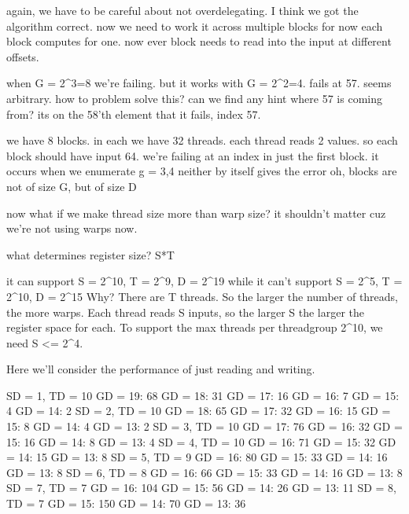 again, we have to be careful about not overdelegating.
I think we got the algorithm correct. now we need to work it across multiple blocks
for now each block computes for one.
now ever block needs to read into the input at different offsets. 

when G = 2^3=8 we're failing. 
but it works with G = 2^2=4.
fails at 57. seems arbitrary.
how to problem solve this?
can we find any hint where 57 is coming from? its on the 58'th element that it fails, index 57.

we have 8 blocks. in each we have 32 threads. each thread reads 2 values.
so each block should have input 64.
we're failing at an index in just the first block.
it occurs when we enumerate g = 3,4
neither by itself gives the error
oh, blocks are not of size G, but of size D

now what if we make thread size more than warp size?
it shouldn't matter cuz we're not using warps now.

what determines register size? S*T

it can support S = 2^10, T = 2^9, D = 2^19
while it can't support S = 2^5, T = 2^10, D = 2^15
Why?
There are T threads. So the larger the number of threads, the more warps.
Each thread reads S inputs, so the larger S the larger the register space for each.
To support the max threads per threadgroup 2^10, we need S <= 2^4.




















Here we'll consider the performance of just reading and writing. 

SD = 1, TD = 10
    GD = 19: 68
    GD = 18: 31
    GD = 17: 16
    GD = 16: 7
    GD = 15: 4
    GD = 14: 2
SD = 2, TD = 10
    GD = 18: 65
    GD = 17: 32
    GD = 16: 15
    GD = 15: 8
    GD = 14: 4
    GD = 13: 2
SD = 3, TD = 10
    GD = 17: 76
    GD = 16: 32
    GD = 15: 16
    GD = 14: 8
    GD = 13: 4
SD = 4, TD = 10
    GD = 16: 71
    GD = 15: 32
    GD = 14: 15
    GD = 13: 8
SD = 5, TD = 9
    GD = 16: 80
    GD = 15: 33
    GD = 14: 16
    GD = 13: 8
SD = 6, TD = 8
    GD = 16: 66
    GD = 15: 33
    GD = 14: 16
    GD = 13: 8
SD = 7, TD = 7
    GD = 16: 104
    GD = 15: 56
    GD = 14: 26
    GD = 13: 11
SD = 8, TD = 7
    GD = 15: 150
    GD = 14: 70
    GD = 13: 36

